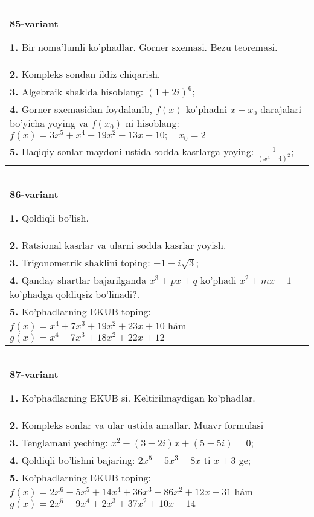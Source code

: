 \documentclass{article}
\begin{document}
\begin{tabular}{m{17cm}}
\textbf{85-variant}
\newline

\textbf{1.} Bir noma’lumli ko’phadlar. Gorner sxemasi. Bezu teoremasi.  \\
\textbf{2.} Kompleks sondan ildiz chiqarish. \\
\textbf{3.} Algebraik shaklda hisoblang: $(1+2 i)^6$; \\
\textbf{4.} Gorner sxemasidan foydalanib, $f(x)$ ko’phadni $x-x_0$ darajalari bo’yicha yoying va $f\left(x_0\right)$ ni hisoblang: $f(x)=3 x^5+x^4-19 x^2-13 x-10 ; \quad x_0=2$ \\
\textbf{5.} Haqiqiy sonlar maydoni ustida sodda kasrlarga yoying:  $\frac{1}{\left(x^4-4\right)^2}$; \\

\end{tabular}
\vspace{1cm}


\begin{tabular}{m{17cm}}
\textbf{86-variant}
\newline

\textbf{1.} Qoldiqli bo’lish.  \\
\textbf{2.} Ratsional kasrlar va ularni sodda kasrlar yoyish. \\
\textbf{3.} Trigonometrik shaklini toping: $-1-i \sqrt{3}$; \\
\textbf{4.} Qanday shartlar bajarilganda $x^3+p x+q$ ko’phadi $x^2+m x-1$ ko’phadga qoldiqsiz bo’linadi?. \\
\textbf{5.} Ko’phadlarning EKUB toping:  $f(x)=x^4+7 x^3+19 x^2+23 x+10$ hám $g(x)=x^4+7 x^3+18 x^2+22 x+12$ \\

\end{tabular}
\vspace{1cm}


\begin{tabular}{m{17cm}}
\textbf{87-variant}
\newline

\textbf{1.} Ko’phadlarning EKUB si. Keltirilmaydigan ko’phadlar. \\
\textbf{2.} Kompleks sonlar va ular ustida amallar. Muavr formulasi  \\
\textbf{3.} Tenglamani yeching:  $x^2-(3-2 i) x+(5-5 i)=0$; \\
\textbf{4.} Qoldiqli bo’lishni bajaring: $2 x^5-5 x^3-8 x$ ti $x+3$ ge; \\
\textbf{5.} Ko’phadlarning EKUB toping:  $f(x)=2 x^6-5 x^5+14 x^4+36 x^3+86 x^2+12 x-31$ hám $g(x)=2 x^5-9 x^4+2 x^3+37 x^2+10 x-14$ \\

\end{tabular}
\vspace{1cm}
\end{document}
